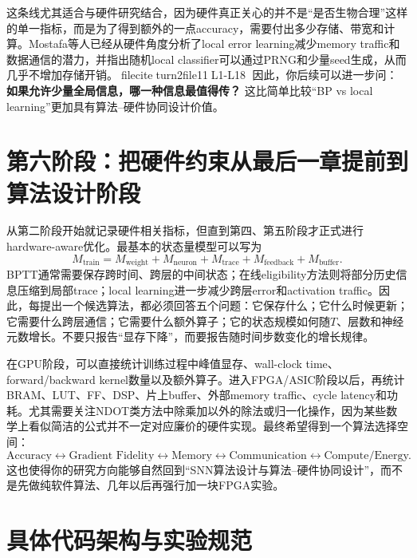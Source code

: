 \documentclass[journal,12pt,onecolumn]{IEEEtran}
\begin{document}
这条线尤其适合与硬件研究结合，因为硬件真正关心的并不是“是否生物合理”这样的单一指标，而是为了得到额外的一点accuracy，需要付出多少存储、带宽和计算。Mostafa等人已经从硬件角度分析了local error learning减少memory traffic和数据通信的潜力，并指出随机local classifier可以通过PRNG和少量seed生成，从而几乎不增加存储开销。fileciteturn2file11L1-L18 因此，你后续可以进一步问：\textbf{如果允许少量全局信息，哪一种信息最值得传？} 这比简单比较“BP vs local learning”更加具有算法--硬件协同设计价值。

\section{第六阶段：把硬件约束从最后一章提前到算法设计阶段}

从第二阶段开始就记录硬件相关指标，但直到第四、第五阶段才正式进行hardware-aware优化。最基本的状态量模型可以写为
\begin{equation}
M_{\mathrm{train}}
=
M_{\mathrm{weight}}
+
M_{\mathrm{neuron}}
+
M_{\mathrm{trace}}
+
M_{\mathrm{feedback}}
+
M_{\mathrm{buffer}}.
\end{equation}
BPTT通常需要保存跨时间、跨层的中间状态；在线eligibility方法则将部分历史信息压缩到局部trace；local learning进一步减少跨层error和activation traffic。因此，每提出一个候选算法，都必须回答五个问题：它保存什么；它什么时候更新；它需要什么跨层通信；它需要什么额外算子；它的状态规模如何随$T$、层数和神经元数增长。不要只报告“显存下降”，而要报告随时间步数变化的增长规律。

在GPU阶段，可以直接统计训练过程中峰值显存、wall-clock time、forward/backward kernel数量以及额外算子。进入FPGA/ASIC阶段以后，再统计BRAM、LUT、FF、DSP、片上buffer、外部memory traffic、cycle latency和功耗。尤其需要关注NDOT类方法中除乘加以外的除法或归一化操作，因为某些数学上看似简洁的公式并不一定对应廉价的硬件实现。最终希望得到一个算法选择空间：
\begin{equation}
\boxed{
\text{Accuracy}
\leftrightarrow
\text{Gradient Fidelity}
\leftrightarrow
\text{Memory}
\leftrightarrow
\text{Communication}
\leftrightarrow
\text{Compute/Energy}
}.
\end{equation}
这也使得你的研究方向能够自然回到“SNN算法设计与算法--硬件协同设计”，而不是先做纯软件算法、几年以后再强行加一块FPGA实验。

\section{具体代码架构与实验规范}
\end{document}
